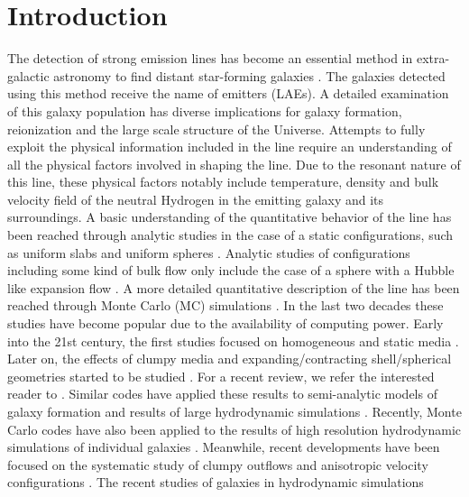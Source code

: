 \section{Introduction}
\label{sec:intro}
The detection of strong \ly emission lines has become an essential
method in extra-galactic astronomy to find distant star-forming
galaxies
\citep{PartridgePeebles,Rhoads00,Gawiser2007,Koehler2007,Ouchi08,Yamada2012,Schenker2012,Finkelstein2013}.
The galaxies detected using this method receive the
name of \ly emitters (LAEs).
A detailed examination of this galaxy population has diverse
implications for galaxy formation, reionization and the large scale
structure of the Universe.
Attempts to fully exploit the physical information included in the \ly
line require an understanding of all the physical factors involved in
shaping the line.
Due to the resonant nature of this line, these physical factors
notably include temperature, density and bulk velocity field of the
neutral Hydrogen in the emitting galaxy and its surroundings.
A basic understanding of the quantitative behavior of the \ly line
has been reached through analytic studies in the case of a static
configurations, such as uniform slabs
\citep[][]{Adams72,Harrington73,Neufeld90} and uniform spheres
\citep{Dijkstra06}.
Analytic studies of configurations including some kind of bulk flow
only include the case of a sphere with a Hubble like expansion flow
\citep{LoebRybicki}.
A more detailed quantitative description of the \ly line has been
reached through Monte Carlo (MC) simulations \citep{Auer68,Avery68,Adams72}.
In the last two decades these studies have become popular due to the
availability of computing power.
Early into the 21st century, the first
studies focused on homogeneous and static media
\citep{Ahn00,Ahn01,Zheng02}.
Later on, the effects of clumpy media \citep{Hansen06} and
expanding/contracting shell/spherical geometries started to be studied
\citep{Ahn03,Verhamme06,Dijkstra06}. For a recent review, we refer the interested reader to \citet{review}.
Similar codes have applied these results to semi-analytic models of
galaxy formation \citep{Orsi12, Garel2012} and results of large
hydrodynamic simulations \citep{CLARA,Forero12,Behrens13}.
Recently, Monte Carlo codes have also been applied to the results of
high resolution hydrodynamic simulations of individual galaxies
\citep{Laursen09,Barnes11,Verhamme12,Yajima12}.
Meanwhile, recent developments have been focused on the systematic
study of clumpy outflows \citep{DijkstraKramer} and anisotropic
velocity configurations \citep{Zheng2013}.
The recent studies of galaxies in hydrodynamic simulations
